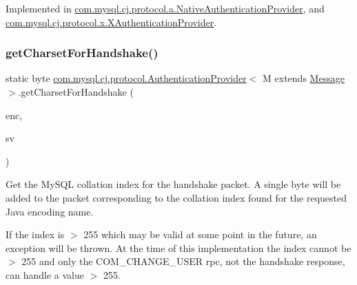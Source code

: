 Implemented in \mbox{\hyperlink{classcom_1_1mysql_1_1cj_1_1protocol_1_1a_1_1_native_authentication_provider_a5cf1296206b1d2ceb53440428a37d6f8}{com.\+mysql.\+cj.\+protocol.\+a.\+Native\+Authentication\+Provider}}, and \mbox{\hyperlink{classcom_1_1mysql_1_1cj_1_1protocol_1_1x_1_1_x_authentication_provider_afd444d5b0926e61a8b14b6300aa739cc}{com.\+mysql.\+cj.\+protocol.\+x.\+X\+Authentication\+Provider}}.

\mbox{\label{interfacecom_1_1mysql_1_1cj_1_1protocol_1_1_authentication_provider_ae63de16063f4716896124e2a70ce18e6}} 
\subsubsection{\texorpdfstring{get\+Charset\+For\+Handshake()}{getCharsetForHandshake()}}
{\footnotesize\ttfamily static byte \mbox{\hyperlink{interfacecom_1_1mysql_1_1cj_1_1protocol_1_1_authentication_provider}{com.\+mysql.\+cj.\+protocol.\+Authentication\+Provider}}$<$ M extends \mbox{\hyperlink{interfacecom_1_1mysql_1_1cj_1_1protocol_1_1_message}{Message}} $>$.get\+Charset\+For\+Handshake (\begin{DoxyParamCaption}\item[{String}]{enc,  }\item[{\mbox{\hyperlink{classcom_1_1mysql_1_1cj_1_1_server_version}{Server\+Version}}}]{sv }\end{DoxyParamCaption})\hspace{0.3cm}{\ttfamily [static]}}

Get the My\+S\+QL collation index for the handshake packet. A single byte will be added to the packet corresponding to the collation index found for the requested Java encoding name.

If the index is $>$ 255 which may be valid at some point in the future, an exception will be thrown. At the time of this implementation the index cannot be $>$ 255 and only the C\+O\+M\+\_\+\+C\+H\+A\+N\+G\+E\+\_\+\+U\+S\+ER rpc, not the handshake response, can handle a value $>$ 255.


